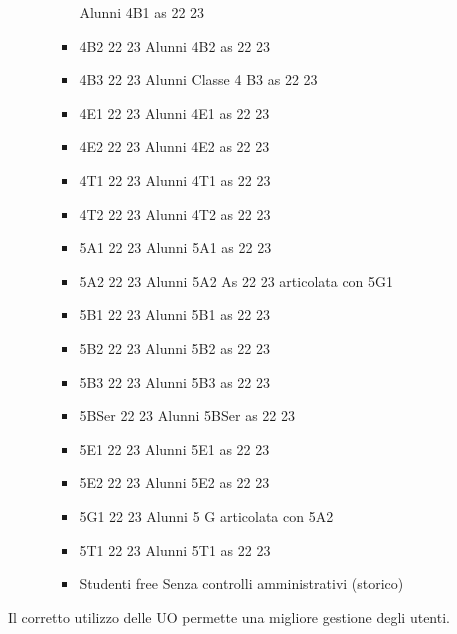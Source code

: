 \begin{itemize}
\begin{itemize}
\begin{itemize}
	Alunni 4B1 as 22 23	
	\item 4B2 22 23
	Alunni 4B2 as 22 23	
	\item 4B3 22 23
	Alunni Classe 4 B3 as 22 23	
	\item 4E1 22 23
	Alunni 4E1 as 22 23	
	\item 4E2 22 23
	Alunni 4E2 as 22 23	
	\item 4T1 22 23
	Alunni 4T1 as 22 23	
	\item 4T2 22 23
	Alunni 4T2 as 22 23	
	\item 5A1 22 23
	Alunni 5A1 as 22 23	
	\item 5A2 22 23
	Alunni 5A2 As 22 23 articolata con 5G1	
	\item 5B1 22 23
	Alunni 5B1 as 22 23	
	\item 5B2 22 23
	Alunni 5B2 as 22 23	
	\item 5B3 22 23
	Alunni 5B3 as 22 23	
	\item 5BSer 22 23
	Alunni 5BSer as 22 23	
	\item 5E1 22 23
	Alunni 5E1 as 22 23	
	\item 5E2 22 23
	Alunni 5E2 as 22 23	
	\item 5G1 22 23
	Alunni 5 G articolata con 5A2	
	\item 5T1 22 23
	Alunni 5T1 as 22 23	
	\item Studenti free
	Senza controlli amministrativi (storico)
\end{itemize}
	\end{itemize}
\end{itemize} 

Il corretto utilizzo delle UO permette  una migliore gestione degli utenti.